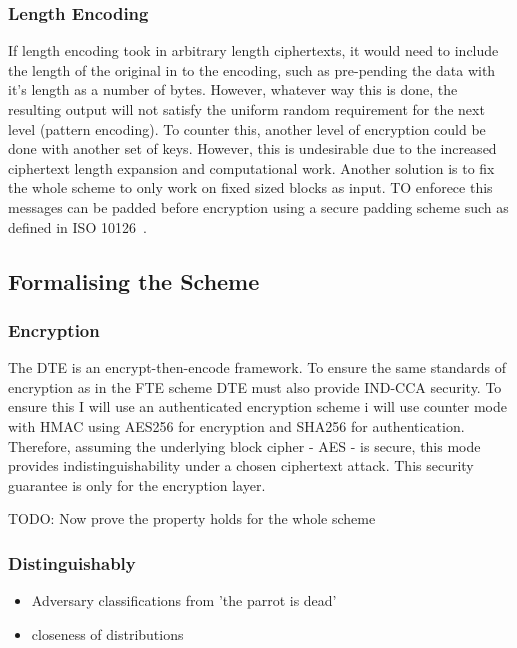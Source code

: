 \documentclass[ %
                    author={Samuel Russell},
                supervisor={Prof. Bogdan Warinschi},
                    degree={MEng},
                     title={Innocuous Ciphertexts},
                  subtitle={The DE-CENSOR Scheme},
                      type={research},
                      year={2018} ]{dissertation}
\begin{document}
\subsubsection{Length Encoding}

If length encoding took in arbitrary length ciphertexts, it would need to include the length of the original in to the encoding, such as pre-pending the data with it's length as a number of bytes.
However, whatever way this is done, the resulting output will not satisfy the uniform random requirement for the next level (pattern encoding).
To counter this, another level of encryption could be done with another set of keys. However, this is undesirable due to the increased ciphertext length expansion and computational work.
Another solution is to fix the whole scheme to only work on fixed sized blocks as input. TO enforece this messages can be padded before encryption using a secure padding scheme such as defined in ISO 10126~\cite{iso-pad}.


\subsection{Formalising the Scheme}

\subsubsection{Encryption}

The DTE is an encrypt-then-encode framework. To ensure the same standards of encryption as in the FTE scheme DTE must also provide IND-CCA security. To ensure this I will use an authenticated encryption scheme i will use counter mode with HMAC using AES256 for encryption and SHA256 for authentication. Therefore, assuming the underlying block cipher - AES - is secure, this mode provides indistinguishability under a chosen ciphertext attack. This security guarantee is only for the encryption layer. 

TODO: Now prove the property holds for the whole scheme

\subsubsection{Distinguishably}

\begin{itemize}
\item Adversary classifications from 'the parrot is dead'
\item closeness of distributions
\end{itemize}
\end{document}
